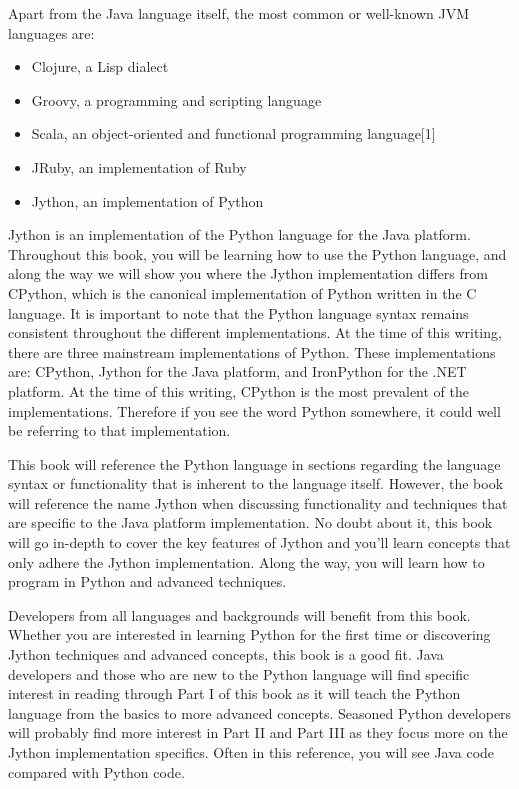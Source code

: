 Apart from the Java language itself, the most common or
well-known JVM languages are:

\begin{itemize}		
	\item Clojure, a Lisp dialect
	\item Groovy, a programming and scripting language
	\item Scala, an object-oriented and functional programming language[1]
	\item JRuby, an implementation of Ruby
	\item Jython, an implementation of Python
\end{itemize}

Jython is an implementation of the Python language for the Java platform. Throughout this book, you will be learning how to use the Python language, and along the way we will show you where the Jython implementation differs from CPython, which is the canonical implementation of Python written in the C language. It is important to note that the Python language syntax remains consistent throughout the different implementations. At the time of this writing, there are three mainstream implementations of Python. These implementations are: CPython, Jython for the Java platform, and IronPython for the .NET platform. At the time of this writing, CPython is the most prevalent of the implementations. Therefore if you see the word Python somewhere, it could well be referring to that implementation.

This book will reference the Python language in sections regarding the language syntax or functionality that is inherent to the language itself. However, the book will reference the name Jython when discussing functionality and techniques that are specific to the Java platform implementation. No doubt about it, this book will go in-depth to cover the key features of Jython and you’ll learn concepts that only adhere the Jython implementation. Along the way, you will learn how to program in Python and advanced techniques.

Developers from all languages and backgrounds will benefit from this book. Whether you are interested in learning Python for the first time or discovering Jython techniques and advanced concepts, this book is a good fit. Java developers and those who are new to the Python language will find specific interest in reading through Part I of this book as it will teach the Python language from the basics to more advanced concepts. Seasoned Python developers will probably find more interest in Part II and Part III as they focus more on the Jython implementation specifics. Often in this reference, you will see Java code compared with Python code.


